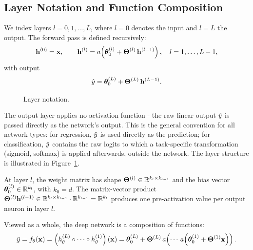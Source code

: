 \subsection{Layer Notation and Function Composition}

We index layers $l = 0, 1, \ldots, L$, where $l=0$ denotes the input and $l=L$ the output. The forward pass is defined recursively:
\begin{equation}
\mathbf{h}^{(0)} = \mathbf{x}, \qquad \mathbf{h}^{(l)} = a\!\left(\boldsymbol{\theta}^{(l)}_0 + \boldsymbol{\Theta}^{(l)}\, \mathbf{h}^{(l-1)}\right), \quad l = 1, \ldots, L-1,
\end{equation}
with output
\begin{equation}
\hat{y} = \boldsymbol{\theta}^{(L)}_0 + \boldsymbol{\Theta}^{(L)}\, \mathbf{h}^{(L-1)}.
\end{equation}



\begin{figure}
\centering
{}
\resizebox{0.48\textwidth}{!}{}
\caption{Layer notation.}
\label{fig:layer_notation}
\end{figure}
The output layer applies no activation function - the raw linear output $\hat{y}$ is passed directly as the network's output. This is the general convention for all network types: for regression, $\hat{y}$ is used directly as the prediction; for classification, $\hat{y}$ contains the raw logits to which a task-specific transformation (sigmoid, softmax) is applied afterwards, outside the network. The layer structure is illustrated in Figure~\ref{fig:layer_notation}.

At layer $l$, the weight matrix has shape $\boldsymbol{\Theta}^{(l)} \in \mathbb{R}^{k_l \times k_{l-1}}$ and the bias vector $\boldsymbol{\theta}^{(l)}_0 \in \mathbb{R}^{k_l}$, with $k_0 = d$. The matrix-vector product $\boldsymbol{\Theta}^{(l)}\mathbf{h}^{(l-1)} \in \mathbb{R}^{k_l \times k_{l-1}} \cdot \mathbb{R}^{k_{l-1}} = \mathbb{R}^{k_l}$ produces one pre-activation value per output neuron in layer $l$.

Viewed as a whole, the deep network is a composition of functions:
\begin{equation}
\hat{y} = f_\theta(\mathbf{x}) = \left(h^{(L)}_\theta \circ \cdots \circ h^{(1)}_\theta\right)(\mathbf{x}) = \boldsymbol{\theta}^{(L)}_0 + \boldsymbol{\Theta}^{(L)}\,a\!\left(\cdots\,a\!\left(\boldsymbol{\theta}^{(1)}_0 + \boldsymbol{\Theta}^{(1)}\mathbf{x}\right)\right).
\end{equation}

